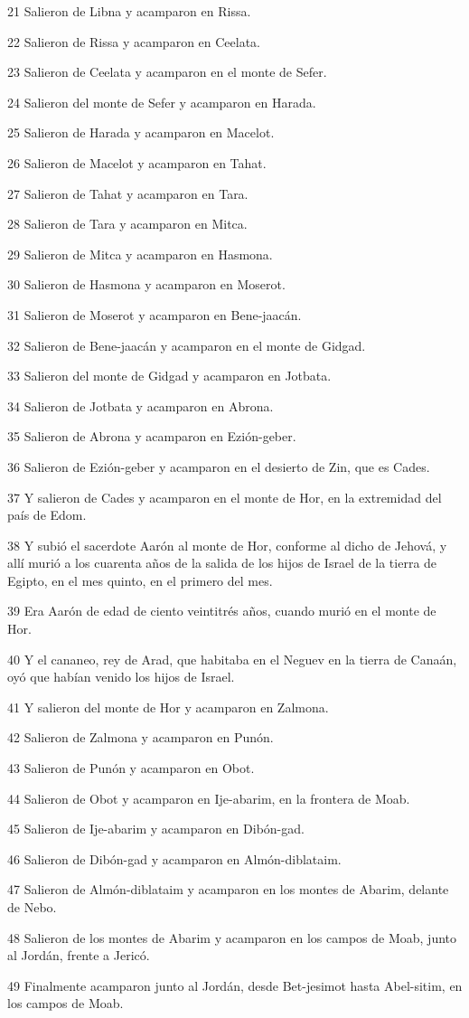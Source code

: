 \par 21 Salieron de Libna y acamparon en Rissa.
\par 22 Salieron de Rissa y acamparon en Ceelata.
\par 23 Salieron de Ceelata y acamparon en el monte de Sefer.
\par 24 Salieron del monte de Sefer y acamparon en Harada.
\par 25 Salieron de Harada y acamparon en Macelot.
\par 26 Salieron de Macelot y acamparon en Tahat.
\par 27 Salieron de Tahat y acamparon en Tara.
\par 28 Salieron de Tara y acamparon en Mitca.
\par 29 Salieron de Mitca y acamparon en Hasmona.
\par 30 Salieron de Hasmona y acamparon en Moserot.
\par 31 Salieron de Moserot y acamparon en Bene-jaacán.
\par 32 Salieron de Bene-jaacán y acamparon en el monte de Gidgad.
\par 33 Salieron del monte de Gidgad y acamparon en Jotbata.
\par 34 Salieron de Jotbata y acamparon en Abrona.
\par 35 Salieron de Abrona y acamparon en Ezión-geber.
\par 36 Salieron de Ezión-geber y acamparon en el desierto de Zin, que es Cades.
\par 37 Y salieron de Cades y acamparon en el monte de Hor, en la extremidad del país de Edom.
\par 38 Y subió el sacerdote Aarón al monte de Hor, conforme al dicho de Jehová, y allí murió  a los cuarenta años de la salida de los hijos de Israel de la tierra de Egipto, en el mes quinto, en el primero del mes.
\par 39 Era Aarón de edad de ciento veintitrés años, cuando murió en el monte de Hor.
\par 40 Y el cananeo, rey de Arad, que habitaba en el Neguev en la tierra de Canaán, oyó que habían venido los hijos de Israel.
\par 41 Y salieron del monte de Hor y acamparon en Zalmona.
\par 42 Salieron de Zalmona y acamparon en Punón.
\par 43 Salieron de Punón y acamparon en Obot.
\par 44 Salieron de Obot y acamparon en Ije-abarim, en la frontera de Moab.
\par 45 Salieron de Ije-abarim y acamparon en Dibón-gad.
\par 46 Salieron de Dibón-gad y acamparon en Almón-diblataim.
\par 47 Salieron de Almón-diblataim y acamparon en los montes de Abarim, delante de Nebo.
\par 48 Salieron de los montes de Abarim y acamparon en los campos de Moab, junto al Jordán, frente a Jericó.
\par 49 Finalmente acamparon junto al Jordán, desde Bet-jesimot hasta Abel-sitim, en los campos de Moab.

